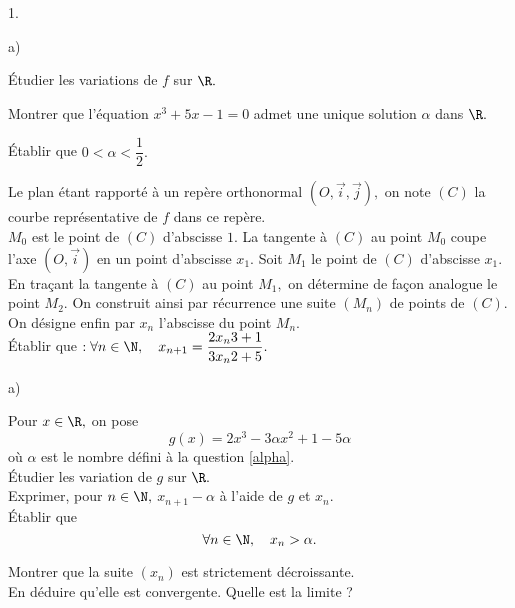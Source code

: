 \documentclass[11pt]{article}%
\begin{document}
\begin{noliste}{1.}
 \setlength{\itemsep}{4mm}
\item 

\begin{noliste}{a)}
 \setlength{\itemsep}{2mm}
\item Étudier les variations de $f$ sur $\R.$

\item \label{alpha}Montrer que l'équation $x^{3} + 5x-1 = 0$ admet une
unique
solution $\alpha $ dans $\R.$

\item Établir que $0<\alpha <\dfrac{1}{2}.$
\end{noliste}

\item Le plan étant rapporté à un repère orthonormal
$(O,\overrightarrow{i},\overrightarrow{j}),$ on note $(C)$ la courbe
représentative de $f$ dans ce
repère.\\
$M_{0}$ est le point de $(C)$ d'abscisse $1.$ La tangente à $(C)$ au
point $M_{0}$ coupe l'axe $(O,\overrightarrow{i})$ en un point
d'abscisse $x_{1}.$
Soit $M_{1}$ le point de $(C)$ d'abscisse $x_{1}.$ En traçant la
tangente à $(C)$ au point $M_{1},$ on détermine de façon analogue le
point $M_{2}.$ On
construit ainsi par récurrence une suite $(M_{n})$ de points de $(C).$
On désigne enfin par $x_{n}$ l'abscisse du point $M_{n}.$\\
Établir que $ :\forall n\in \N,\quad x_{n + 1} = \dfrac{2x_{n}{3} +
1}{3x_{n}{2} + 5}.$

\item 

\begin{noliste}{a)}
 \setlength{\itemsep}{2mm}
\item Pour $x\in \R,$ on pose 
\[
g(x) = 2x^{3}-3\alpha x^{2} + 1-5\alpha
\]
où $\alpha $ est le nombre défini à la question \ref{alpha}.\\
Étudier les variation de $g$ sur $\R.$\\
Exprimer, pour $n\in \N,$ $x_{n + 1}-\alpha $ à l'aide de $g$ et
$x_{n}.$\\
Établir que 
\[
\forall n\in \N,\quad x_{n}>\alpha.
\]

\item Montrer que la suite $(x_{n})$ est strictement décroissante.\\
En déduire qu'elle est convergente. Quelle est la limite ?
\end{noliste}

\item 


\end{noliste}
\end{document}
